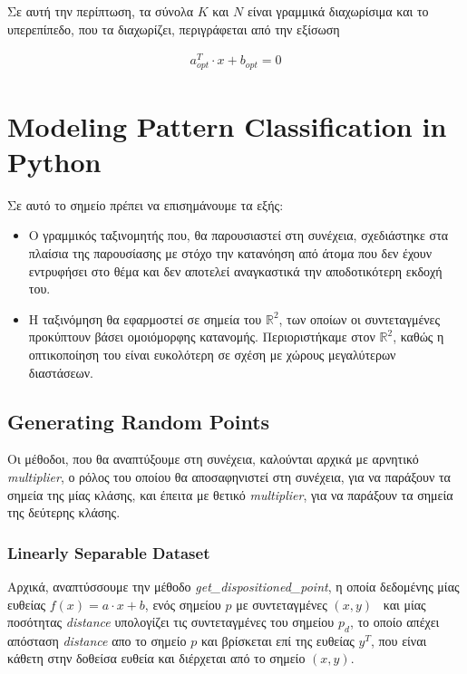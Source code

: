 \documentclass[12pt]{article}
\newcommand{\R}{\mathbb{R}}
\newcommand{\centered}[1]{\begin{align*}#1\end{align*}}
\begin{document}
Σε αυτή την περίπτωση, τα σύνολα \( K \) και \( N \) είναι γραμμικά διαχωρίσιμα και
το υπερεπίπεδο, που τα διαχωρίζει, περιγράφεται από την εξίσωση

\centered{a^{T}_{opt} \cdot x + b_{opt} = 0}

\pagebreak

\section{Modeling Pattern Classification in Python}

Σε αυτό το σημείο πρέπει να επισημάνουμε τα εξής: \\

\begin{itemize}
    \item Ο γραμμικός ταξινομητής που, θα παρουσιαστεί στη συνέχεια,
    σχεδιάστηκε στα πλαίσια της παρουσίασης με στόχο την κατανόηση
    από άτομα που δεν έχουν εντρυφήσει στο θέμα και δεν αποτελεί αναγκαστικά
    την αποδοτικότερη εκδοχή του. \\

    \item Η ταξινόμηση θα εφαρμοστεί σε σημεία του \( \R^2 \),
    των οποίων οι συντεταγμένες προκύπτουν βάσει ομοιόμορφης κατανομής.
    Περιοριστήκαμε στον \( \R^2 \), καθώς η οπτικοποίηση του είναι ευκολότερη
    σε σχέση με χώρους μεγαλύτερων διαστάσεων. \\
\end{itemize}

\subsection{Generating Random Points}

Οι μέθοδοι, που θα αναπτύξουμε στη συνέχεια, καλούνται αρχικά με αρνητικό \textit{multiplier},
ο ρόλος του οποίου θα αποσαφηνιστεί στη συνέχεια,
για να παράξουν τα σημεία της μίας κλάσης, και έπειτα με θετικό \textit{multiplier},
για να παράξουν τα σημεία της δεύτερης κλάσης. \\

\subsubsection{Linearly Separable Dataset}

Αρχικά, αναπτύσσουμε την μέθοδο \textit{get\_dispositioned\_point},
η οποία δεδομένης μίας ευθείας \( f(x) = a \cdot x + b \),
ενός σημείου \( p \) με συντεταγμένες \( (x, y) \) \ και
μίας ποσότητας \textit{distance} υπολογίζει τις συντεταγμένες του σημείου \( p_d \),
το οποίο απέχει απόσταση \textit{distance} απο το σημείο \( p \) και
βρίσκεται επί της ευθείας \( y^T \), που είναι κάθετη στην δοθείσα ευθεία και
διέρχεται από το σημείο \( (x, y) \). \\
\end{document}
